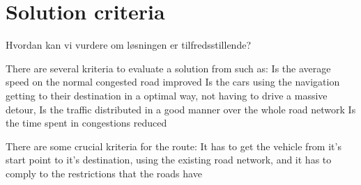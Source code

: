 \section{Solution criteria}
Hvordan kan vi vurdere om løsningen er tilfredsstillende?

There are several kriteria to evaluate a solution from such as:
Is the average speed on the normal congested road improved
Is the cars using the navigation getting to their destination in a optimal way, not having to drive a massive detour,
Is the traffic distributed in a good manner over the whole road network
Is the time spent in congestions reduced


There are some crucial kriteria for the route:
It has to get the vehicle from it's start point to it's destination, using the existing road network, and it has to comply to the restrictions that the roads have